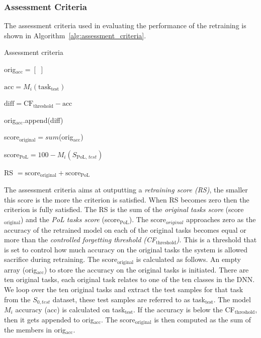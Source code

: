 \subsubsection{Assessment Criteria}
The assessment criteria used in evaluating the performance of the retraining is shown in Algorithm~\ref{alg:assessment_criteria}.
%
\begin{algorithm}
\caption{Assessment criteria}\label{alg:assessment_criteria}
\begin{algorithmic}
\State orig$_{\text{acc}} = [\text{~}]$



\State $\text{acc} = M_i(\text{task}_{\text{test}})$

\State $\text{diff} = \text{CF}_{\text{threshold}} - \text{acc}$


    \State orig$_{\text{acc}}$.append(diff)
    
\EndIf


\EndFor

\State score$_{\text{original}} = sum$(orig$_{\text{acc}}$)

\State score$_{\text{PoL}} = 100 - M_i(S_{\text{PoL, }test})$

\State RS $= \text{score}_{\text{original}} + \text{score}_{\text{PoL}}$

\end{algorithmic}
\end{algorithm}
%
The assessment criteria aims at outputting a \textit{retraining score (RS)}, the smaller this score is the more the criterion is satisfied. When RS becomes zero then the criterion is fully satisfied. 
%
The RS is the sum of the \textit{original tasks score} (score$_{\text{original}}$) and the \textit{PoL tasks score} (score$_\text{{PoL}}$).
%
The score$_{original}$ approaches zero as the accuracy of the retrained model on each of the original tasks becomes equal or more than the \textit{controlled forgetting threshold (CF$_{\text{threshold}}$)}. 
%
This is a threshold that is set to control how much accuracy on the original tasks the system is allowed sacrifice during retraining. 
%
The score$_{\text{original}}$ is calculated as follows. An empty array (orig$_{\text{acc}}$) to store the accuracy on the original tasks is initiated. 
There are ten original tasks, each original task relates to one of the ten classes in the DNN. 
%
We loop over the ten original tasks and extract the test samples for that task from the $S_{0, test}$ dataset, these test samples are referred to as task$_{\text{test}}$.
%
The model $M_i$ accuracy (acc) is calculated on task$_{\text{test}}$.
%
If the accuracy is below the CF$_{\text{threshold}}$, then it gets appended to orig$_{\text{acc}}$. 
%
The score$_{\text{original}}$ is then computed as the sum of the members in orig$_{\text{acc}}$.

